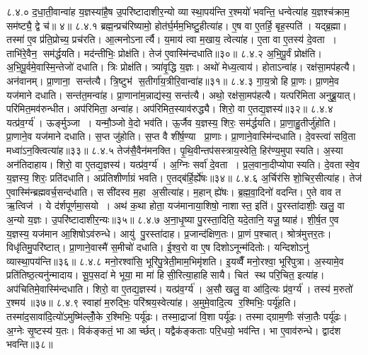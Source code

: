 ८.४.०
द॒धा॒ती॒वान्वा॑ह य॒ज्ञस्या॑है॒ष उ॒परि॑ष्टादाशीर॒न्यो व्यास्था॒पय॑न्ति र॒श्मयो॑ भवन्ति॒ धन्वेत्या॑ह य॒ज्ञश्च॑क्राम॒ सम॑ष्ट्यै॒ द्वे च॑॥ ४॥
८.४.१
ब्रह्म॒न्प्रच॑रिष्यामो॒ होत॑र्घ॒र्मम॒भिष्टु॒हीत्या॑ह। ए॒ष वा ए॒तर्\mbox{}हि॒ बृह॒स्पति॑। यद्ब्र॒ह्मा। तस्मा॑ ए॒व प्र॑ति॒प्रोच्य॒ प्रच॑रति। आ॒त्मनोऽनार्त्यै। य॒माय॑ त्वा म॒खाय॒ त्वेत्या॑ह। ए॒ता वा ए॒तस्य॑ दे॒वता। ताभि॑रे॒वैन॒ सम॑र्द्धयति। मद॑न्तीभिः॒ प्रोक्ष॑ति। तेज॑ ए॒वास्मि॑न्दधाति॥३०॥
८.४.२
अ॒भि॒पू॒र्वं प्रोक्ष॑ति। अ॒भि॒पू॒र्वमे॒वास्मि॒न्तेजो॑ दधाति। त्रिः प्रोक्ष॑ति। त्र्या॑वृ॒द्धि य॒ज्ञः। अथो॑ मेध्य॒त्वाय॑। होताऽन्वा॑ह। रक्ष॑सा॒मप॑हत्यै। अन॑वानम्। प्रा॒णाना॒ सन्त॑त्यै। त्रि॒ष्टुभ॑ स॒तीर्गा॑य॒त्रीरि॒वान्वा॑ह॥३१॥
८.४.३
गा॒य॒त्रो हि प्रा॒णः। प्रा॒णमे॒व यज॑माने दधाति। सन्त॑त॒मन्वा॑ह। प्रा॒णाना॑म॒न्नाद्य॑स्य॒ सन्त॑त्यै। अथो॒ रक्ष॑सा॒मप॑हत्यै। यत्परि॑मिता अनुब्रू॒यात्। परि॑मित॒मव॑रुन्धीत। अप॑रिमिता॒ अन्वा॑ह। अप॑रिमित॒स्याव॑रुद्ध्यै। शिरो॒ वा ए॒तद्य॒ज्ञस्य॑॥३२॥
८.४.४
यत्प्र॑व॒र्ग्य॑। ऊर्ङ्मुञ्जा। यन्मौ॒ञ्जो वे॒दो भव॑ति। ऊ॒र्जैव य॒ज्ञस्य॒ शिरः॒ सम॑र्द्धयति। प्रा॒णा॒हु॒तीर्जु॑होति। प्रा॒णाने॒व यज॑माने दधाति। स॒प्त जु॑होति। स॒प्त वै शी॑र्\mbox{}ष॒ण्या प्रा॒णाः। प्रा॒णाने॒वास्मि॑न्दधाति। दे॒वस्त्वा॑ सवि॒ता मध्वा॑ऽन॒क्त्वित्या॑ह॥३३॥
८.४.५
तेज॑सै॒वैन॑मनक्ति। पृ॒थि॒वीन्तप॑सस्त्राय॒स्वेति॒ हिर॑ण्य॒मुपास्यति। अ॒स्या अन॑तिदाहाय। शिरो॒ वा ए॒तद्य॒ज्ञस्य॑। यत्प्र॑व॒र्ग्य॑। अ॒ग्निः सर्वा॑ दे॒वता। प्र॒ल॒वाना॒दीप्योपास्यति। दे॒वतास्वे॒व य॒ज्ञस्य॒ शिरः॒ प्रति॑दधाति। अप्र॑तिशीर्णाग्रं भवति। ए॒तद्ब॑र्\mbox{}हि॒र्\mbox{}ह्ये॑षः॥३४॥
८.४.६
अ॒र्चिर॑सि शो॒चिर॒सीत्या॑ह। तेज॑ ए॒वास्मि॑न्ब्रह्मवर्च॒सन्द॑धाति। ससी॑दस्व म॒हा अ॒सीत्या॑ह। म॒हान् ह्ये॑षः। ब्र॒ह्म॒वा॒दिनो॑ वदन्ति। ए॒ते वाव त ऋ॒त्विज॑। ये द॑र्\mbox{}शपूर्णमा॒सयो। अथ॑ क॒था होता॒ यज॑मानाया॒शिषो॒ नाशास्त॒ इति॑। पु॒रस्ता॑दाशीः॒ खलु॒ वा अ॒न्यो य॒ज्ञः। उ॒परि॑ष्टादाशीर॒न्यः॥३५॥
८.४.७
अ॒ना॒धृ॒ष्या पु॒रस्ता॒दिति॒ यदे॒तानि॒ यजू॒ष्याह॑। शी॒र्\mbox{}ष॒त ए॒व य॒ज्ञस्य॒ यज॑मान आ॒शिषोऽव॑रुन्धे। आयु॑ पु॒रस्ता॑दाह। प्र॒जान्द॑क्षिण॒तः। प्रा॒णं प॒श्चात्। श्रोत्र॑मुत्तर॒तः। विधृ॑तिमु॒परि॑ष्टात्। प्रा॒णाने॒वास्मै॑ स॒मीचो॑ दधाति। ई॒श्व॒रो वा ए॒ष दिशोऽनून्म॑दितोः। यन्दिशोऽनु॑ व्यास्था॒पय॑न्ति॥३६॥
८.४.८
मनो॒रश्वा॑सि॒ भूरि॑पु॒त्रेती॒माम॒भिमृ॑शति। इ॒यव्वैँ मनो॒रश्वा॒ भूरि॑पुत्रा। अ॒स्यामे॒व प्रति॑तिष्ठ॒त्यनु॑न्मादाय। सू॒प॒सदा॑ मे भूया॒ मा मा॑ हिसी॒रित्या॒हाहिसायै। चित॑ स्थ परि॒चित॒ इत्या॑ह। अप॑चितिमे॒वास्मि॑न्दधाति। शिरो॒ वा ए॒तद्य॒ज्ञस्य॑। यत्प्र॑व॒र्ग्य॑। अ॒सौ खलु॒ वा आ॑दि॒त्यः प्र॑व॒र्ग्य॑। तस्य॑ म॒रुतो॑ र॒श्मय॑॥३७॥
८.४.९
स्वाहा॑ म॒रुद्भिः॒ परि॑श्रय॒स्वेत्या॑ह। अ॒मुमे॒वादि॒त्य र॒श्मिभिः॒ पर्यू॑हति। तस्मा॑द॒सावा॑दि॒त्यो॑ऽमुष्मि॑ल्लोँ॒के र॒श्मिभिः॒ पर्यू॑ढः। तस्मा॒द्राजा॑ वि॒शा पर्यू॑ढः। तस्माद्ग्राम॒णीः स॑जा॒तैः पर्यू॑ढः। अ॒ग्नेः सृ॒ष्टस्य॑ य॒तः। विक॑ङ्कतं॒ भा आर्च्छत्। यद्वैक॑ङ्कताः परि॒धयो॒ भव॑न्ति। भा ए॒वाव॑रुन्धे। द्वाद॑श भवन्ति॥३८॥
